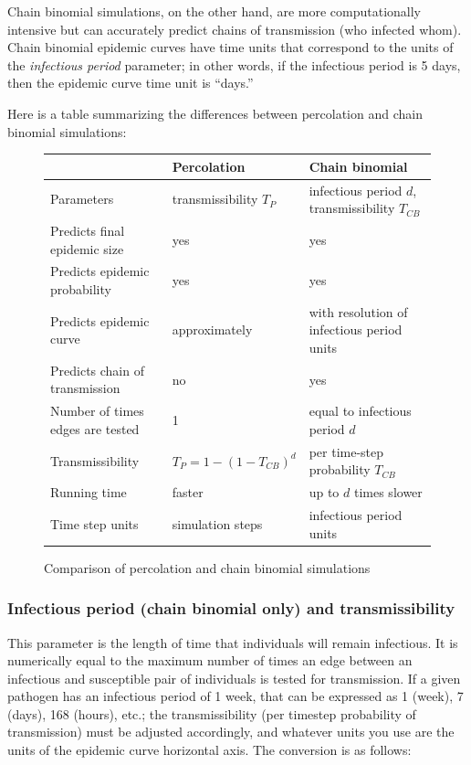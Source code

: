 \documentclass{article}
\begin{document}
Chain binomial simulations, on the other hand, are more computationally intensive but can accurately predict chains of transmission (who infected whom).  Chain binomial epidemic curves have time units that correspond to the units of the \textit{infectious period} parameter; in other words, if the infectious period is 5 days, then the epidemic curve time unit is ``days.''

\pagebreak
Here is a table summarizing the differences between percolation and chain binomial simulations:

\UndefineShortVerb{\|}
\begin{figure}[h]
\begin{center}
\begin{tabular}{|l|l|l|}
\hline
& Percolation & Chain binomial \\ \hline
Parameters & transmissibility $T_{P}$ & infectious period $d$, transmissibility $T_{CB}$\\
Predicts final epidemic size & yes & yes\\ 
Predicts epidemic probability & yes & yes\\ 
Predicts epidemic curve & approximately & with resolution of infectious period units\\
Predicts chain of transmission & no & yes\\
Number of times edges are tested & 1 & equal to infectious period $d$\\ 
Transmissibility & $T_{P} = 1 - (1-T_{CB})^d$ & per time-step probability $T_{CB}$\\ 
Running time & faster & up to $d$ times slower\\ 
Time step units & simulation steps & infectious period units \\
\hline
\end{tabular}
\caption{Comparison of percolation and chain binomial simulations}
\end{center}
\end{figure}
\DefineShortVerb{\|}

\subsubsection{Infectious period (chain binomial only) and transmissibility}
This parameter is the length of time that individuals will remain infectious.  It is numerically equal to the maximum number of times an edge between an infectious and susceptible pair of individuals is tested for transmission.  If a given pathogen has an infectious period of 1 week, that can be expressed as 1 (week), 7 (days), 168 (hours), etc.; the transmissibility (per time\textendash step probability of transmission) must be adjusted accordingly, and whatever units you use are the units of the epidemic curve horizontal axis.  The conversion is as follows:
\end{document}
